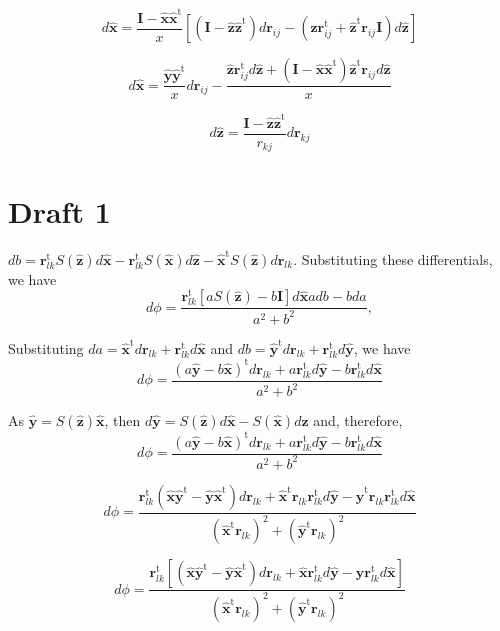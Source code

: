 \documentclass[11pt]{article}
\newcommand{\mt}[1]{\boldsymbol{\mathbf{#1}}}           %
\newcommand{\vt}[1]{\boldsymbol{\mathbf{#1}}}           %
\newcommand{\tr}[1]{#1^\text{t}}                        %
\begin{document}
\[
d\hat{\vt x} = \frac{\mt I - \hat{\vt x}\tr{\hat{\vt x}}}{x} \left[ (\mt I - \hat{\vt z}\tr{\hat{\vt z}})d{\vt r}_{ij} - (\hat{\vt z}\tr{{\vt r}_{ij}} + \tr{\hat{\vt z}} {\vt r}_{ij} \mt I) d\hat{\vt z} \right]
\]

\[
d\hat{\vt x} = \frac{\hat{\vt y}\tr{\hat{\vt y}}}{x}d{\vt r}_{ij} - \frac{ \hat{\vt z}\tr{{\vt r}_{ij}}d\hat{\vt z} + (\mt I - \hat{\vt x}\tr{\hat{\vt x}})\tr{\hat{\vt z}} {\vt r}_{ij} d\hat{\vt z}    }{x}
\]

\[
d\hat{\vt z} = \frac{\mt I - \hat{\vt z}\tr{\hat{\vt z}}}{r_{kj}} d{\vt r}_{kj}
\]



\section{Draft 1}

$db = \tr{{\vt r}_{lk}}S(\hat{\vt z})d\hat{\vt x} - \tr{{\vt r}_{lk}}S(\hat{\vt x})d\hat{\vt z} - \tr{\hat{\vt x}}S(\hat{\vt z})d{\vt r}_{lk}$. Substituting these differentials, we have
\[
d\phi = \frac{\tr{{\vt r}_{lk}}[a S(\hat{\vt z}) - b\mt I]d\hat{\vt x}   a db - b da}{a^2 + b^2},
\]




Substituting $da = \tr{\hat{\vt x}}d{\vt r}_{lk} + \tr{{\vt r}_{lk}}d\hat{\vt x}$ and $db = \tr{\hat{\vt y}}d{\vt r}_{lk} + \tr{{\vt r}_{lk}}d\hat{\vt y}$, we have
\[
d\phi = \frac{\tr{(a\hat{\vt y}-b\hat{\vt x})}d{\vt r}_{lk} + a\tr{{\vt r}_{lk}}d\hat{\vt y} - b\tr{{\vt r}_{lk}}d\hat{\vt x}}{a^2 + b^2}
\]

As $\hat{\vt y} = S(\hat{\vt z})\hat{\vt x}$, then $d\hat{\vt y} = S(\hat{\vt z})d\hat{\vt x} - S(\hat{\vt x})d\hat{\vt z}$ and, therefore,
\[
d\phi = \frac{\tr{(a\hat{\vt y}-b\hat{\vt x})}d{\vt r}_{lk} + a\tr{{\vt r}_{lk}}d\hat{\vt y} - b\tr{{\vt r}_{lk}}d\hat{\vt x}}{a^2 + b^2}
\]

\[
d\phi = \frac{ \tr{{\vt r}_{lk}}(\hat{\vt x}\tr{\hat{\vt y}} - \hat{\vt y}\tr{\hat{\vt x}})d{\vt r}_{lk} +   \tr{\hat{\vt x}}{\vt r}_{lk}\tr{{\vt r}_{lk}}d\hat{\vt y} - \tr{\hat{\vt y}}{\vt r}_{lk}\tr{{\vt r}_{lk}}d\hat{\vt x}     }{(\tr{\hat{\vt x}}{\vt r}_{lk})^2 + (\tr{\hat{\vt y}}{\vt r}_{lk})^2}
\]

\[
d\phi = \frac{ \tr{{\vt r}_{lk}}[(\hat{\vt x}\tr{\hat{\vt y}} - \hat{\vt y}\tr{\hat{\vt x}})d{\vt r}_{lk} + \hat{\vt x}\tr{{\vt r}_{lk}}d\hat{\vt y} - \hat{\vt y}\tr{{\vt r}_{lk}}d\hat{\vt x}  ]       }{(\tr{\hat{\vt x}}{\vt r}_{lk})^2 + (\tr{\hat{\vt y}}{\vt r}_{lk})^2}
\]
\end{document}
